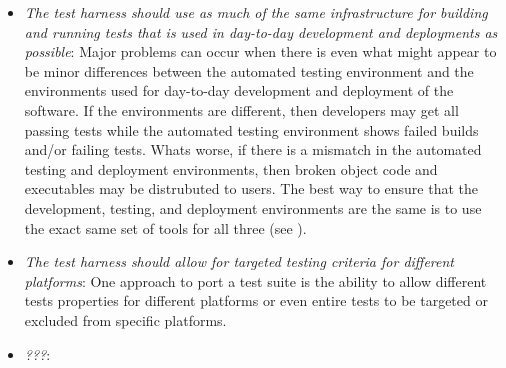 \documentclass[pdf,ps2pdf,11pt]{SANDreport}
\begin{document}
\begin{itemize}

{}\item\textit{The test harness should use as much of the same
infrastructure for building and running tests that is used in
day-to-day development and deployments as possible}: Major problems
can occur when there is even what might appear to be minor differences
between the automated testing environment and the environments used
for day-to-day development and deployment of the software.  If the
environments are different, then developers may get all passing tests
while the automated testing environment shows failed builds and/or
failing tests.  Whats worse, if there is a mismatch in the automated
testing and deployment environments, then broken object code and
executables may be distrubuted to users.  The best way to ensure that
the development, testing, and deployment environments are the same is
to use the exact same set of tools for all three (see
{}\cite{book:continuous-integration}).

{}\item\textit{The test harness should allow for targeted testing
criteria for different platforms}: One approach to port a test suite
is the ability to allow different tests properties for different
platforms or even entire tests to be targeted or excluded from
specific platforms.

{}\item\textit{???}:

\end{itemize}


%
\clearpage




%



\begin{SANDdistribution}[NM]
\end{SANDdistribution}
\end{document}
